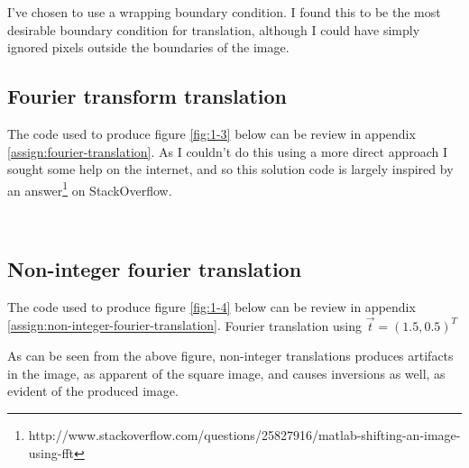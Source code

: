 
I've chosen to use a wrapping boundary condition. I found this to be the most
desirable boundary condition for translation, although I could have simply
ignored pixels outside the boundaries of the image.

\newpage
\begin{multicols}{2}
    \subsection{Fourier transform translation}
    The code used to produce figure \ref{fig:1-3} below can be review in
    appendix \ref{assign:fourier-translation}.
    As I couldn't do this using a more direct approach I sought some help on
    the internet, and so this solution code is largely inspired by an
    answer\footnote{http://www.stackoverflow.com/questions/25827916/matlab-shifting-an-image-using-fft} on StackOverflow.
    
    \vfill{\ }\columnbreak
    
    \subsection{Non-integer fourier translation}
    The code used to produce figure \ref{fig:1-4} below can be review in
    appendix \ref{assign:non-integer-fourier-translation}.
    {Fourier translation using $\vec{t} = (1.5,0.5)^T$}
    
    As can be seen from the above figure, non-integer translations produces
    artifacts in the image, as apparent of the square image, and causes
    inversions as well, as evident of the  produced image.
\end{multicols}

